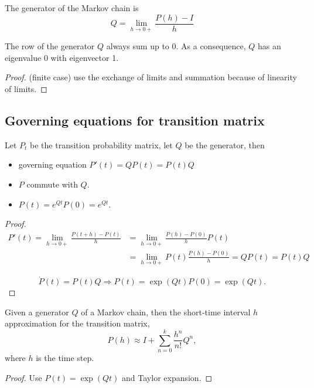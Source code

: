 \begin{refsection}
\begin{definition}[generator]\cite[180]{privault2013understanding}
The generator of the Markov chain is 
$$Q = \lim_{h\to 0+} \frac{P(h)-I}{h}$$
\end{definition}

\begin{lemma}
The row of the generator $Q$ always sum up to 0. As a consequence, $Q$ has an eigenvalue 0 with eigenvector 1.
\end{lemma}
\begin{proof}
(finite case) use the exchange of limits and summation because of linearity of limits.
\end{proof}





\subsection{Governing equations for transition matrix}



\begin{lemma}
Let $P_t$ be the transition probability matrix, let $Q$ be the generator, then
\begin{itemize}
	\item governing equation $P'(t) = QP(t) = P(t)Q$
	\item $P$ commute with $Q$.
	\item $P(t) = e^{Qt}P(0) = e^{Qt}$.
\end{itemize}
\end{lemma}
\begin{proof}
\begin{align*}
P'(t) = \lim_{h\to0+} \frac{P(t+h)-P(t)}{h}&=\lim_{h\to0+} \frac{P(h)-P(0)}{h}P(t)\\
&=\lim_{h\to0+} P(t)\frac{P(h)-P(0)}{h} = QP(t)=P(t)Q   
\end{align*}

$$\dot{P}(t) = P(t)Q \Rightarrow P(t) = \exp(Qt)P(0) = \exp(Qt).$$
\end{proof}


\begin{corollary}
Given a generator $Q$ of a Markov chain, then the short-time interval $h$ approximation for the transition matrix,
	$$P(h) \approx I + \sum_{n=0}^k \frac{h^n}{n!}Q^n,$$
	where $h$ is the time step.
\end{corollary}
\begin{proof}
	Use $P(t) = \exp(Qt)$ and Taylor expansion.
\end{proof}

\end{refsection}
